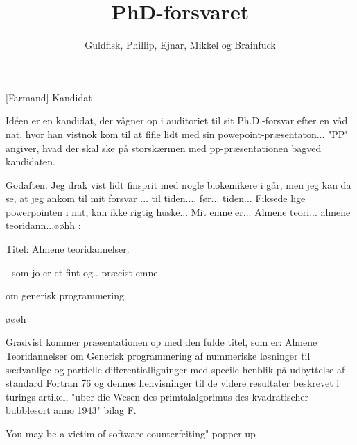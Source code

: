 \documentclass[a4paper,11pt]{article}
\title{PhD-forsvaret}
\author{Guldfisk, Phillip, Ejnar, Mikkel og Brainfuck}
\begin{document}
\maketitle

\begin{roles}
[Farmand] Kandidat
\end{roles}

\begin{props}
\end{props}

  
\begin{sketch}
Idéen er en kandidat, der vågner op i auditoriet til sit Ph.D.-forsvar efter en våd nat, hvor han vistnok kom til at fifle lidt med sin powepoint-præsentaton...
"PP" angiver, hvad der skal ske på storskærmen med pp-præsentationen bagved kandidaten.


 Godaften. Jeg drak vist lidt finsprit med nogle biokemikere i går, men jeg kan da se, at jeg ankom til mit forsvar ... til tiden.... før... tiden...  Fiksede lige powerpointen i nat, kan ikke rigtig huske... Mit emne er... Almene teori... almene teoridann...øøhh : 

 Titel: Almene teoridannelser. 

   - som jo er et fint og.. præcist emne. 

 om generisk programmering

 øøøh 

    Gradvist kommer præsentationen op med den fulde titel, som er: Almene Teoridannelser om Generisk programmering af nummeriske løsninger til sædvanlige og partielle differentialligninger med specile henblik på udbyttelse af standard Fortran 76 og dennes henvisninger til de videre resultater beskrevet i turings artikel, "uber die Wesen des primtalalgorimus des kvadratischer bubblesort anno 1943" bilag F.

You may be a victim of software counterfeiting" popper up


\end{sketch}
\end{document}
